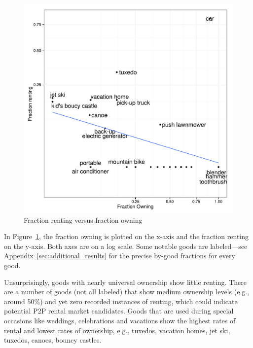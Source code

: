 \documentclass[11pt]{article}
\begin{document}
\begin{figure}
\centering 
\caption{Fraction renting versus fraction owning \label{fig:scatter} }
\begin{minipage}{0.60 \linewidth}
\includegraphics[width = \linewidth]{./plots/scatter_rent_v_own.pdf} 
\end{minipage} 
\end{figure} 

In Figure~\ref{fig:scatter}, the fraction owning is plotted on the x-axis and the fraction renting on the y-axis.
Both axes are on a log scale. 
Some notable goods are labeled---see Appendix~\ref{sec:additional_results} for the precise by-good fractions for every good.

Unsurprisingly, goods with nearly universal ownership show little renting. 
There are a number of goods (not all labeled) that show medium ownership levels (e.g., around 50\%) and yet zero recorded instances of renting, which could indicate potential P2P rental market candidates. 
Goods that are used during special occasions like weddings, celebrations and vacations show the highest rates of rental and lowest rates of ownership, e.g., tuxedos, vacation homes, jet ski, tuxedos, canoes, bouncy castles. 


\end{document}
